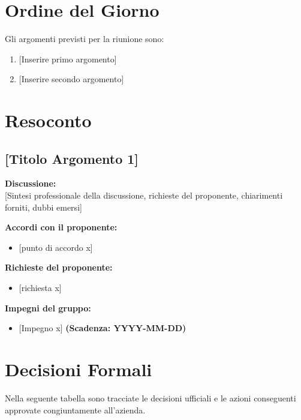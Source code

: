 \section{Ordine del Giorno}
Gli argomenti previsti per la riunione sono:
\begin{enumerate}
	\item {[Inserire primo argomento]}
	\item {[Inserire secondo argomento]}
\end{enumerate}

\section{Resoconto}

\subsection{{[Titolo Argomento 1]}}
\textbf{Discussione:} \\
{[Sintesi professionale della discussione, richieste del proponente, chiarimenti forniti, dubbi emersi]}

\vspace{0.3cm}
\textbf{Accordi con il proponente:}
\begin{itemize}
	\item {[punto di accordo x]}
\end{itemize}

\vspace{0.1cm}
\textbf{Richieste del proponente:}
\begin{itemize}
	\item {[richiesta x]}
\end{itemize}

\vspace{0.1cm}
\textbf{Impegni del gruppo:}
\begin{itemize}
	\item {[Impegno x]} \textbf{(Scadenza: YYYY-MM-DD)}
\end{itemize}

\section{Decisioni Formali}
Nella seguente tabella sono tracciate le decisioni ufficiali e le azioni conseguenti approvate congiuntamente all'azienda.


